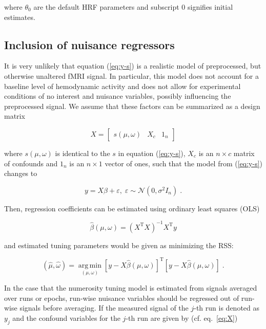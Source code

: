 \documentclass[a4paper,12pt]{article}
\begin{document}
where $\theta_0$ are the default HRF parameters and subscript 0 signifies initial estimates.


\subsection{Inclusion of nuisance regressors}

It is very unlikely that equation (\ref{eq:y-s}) is a realistic model of preprocessed, but otherwise unaltered fMRI signal. In particular, this model does not account for a baseline level of hemodynamic activity and does not allow for experimental conditions of no interest and nuisance variables, possibly influencing the preprocessed signal. We assume that these factors can be summarized as a design matrix

\begin{equation} \label{eq:X}
X = \left[ \begin{matrix} s(\mu,\omega) & X_c & 1_n \end{matrix} \right]
\end{equation}

where $s(\mu,\omega)$ is identical to the $s$ in equation (\ref{eq:y-s}), $X_c$ is an $n \times c$ matrix of confounds and $1_n$ is an $n \times 1$ vector of ones, such that the model from (\ref{eq:y-s}) changes to

\begin{equation} \label{eq:y-X}
y = X \beta + \varepsilon, \; \varepsilon \sim \mathcal{N}(0, \sigma^2 I_n) \; .
\end{equation}

Then, regression coefficients can be estimated using ordinary least squares (OLS)

\begin{equation} \label{eq:b-est-X}
\hat{\beta}(\mu,\omega) = (X^\mathrm{T} X)^{-1} X^\mathrm{T} y
\end{equation}

and estimated tuning parameters would be given as minimizing the RSS:

\begin{equation} \label{eq:mu-tw-est-X}
(\hat{\mu},\hat{\omega}) = \operatorname*{arg\,min}_{(\mu,\omega)} \left[ y - X \hat{\beta}(\mu,\omega) \right]^\mathrm{T} \left[ y - X \hat{\beta}(\mu,\omega) \right] \; .
\end{equation}

In the case that the numerosity tuning model is estimated from signals averaged over runs or epochs, run-wise nuisance variables should be regressed out of run-wise signals before averaging. If the measured signal of the $j$-th run is denoted as $y_j$ and the confound variables for the $j$-th run are given by (cf. eq.~\ref{eq:X})
\end{document}
